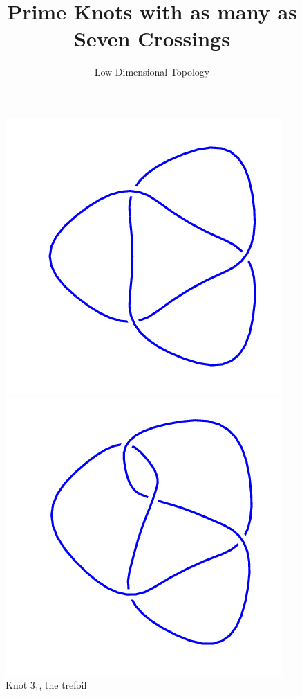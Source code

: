 \documentclass{article}
\title{Prime Knots with as many as Seven Crossings}
\author{Low Dimensional Topology}
\begin{document}
\maketitle

\begin{figure}[!htb]
\includegraphics[width=\linewidth]{3_1.png}
\caption{Knot $3_1$, the trefoil}
\endminipage\hfill
{}
\includegraphics[width=\linewidth]{4_1.png}

\end{figure}
\end{document}

